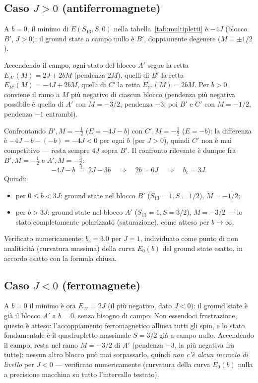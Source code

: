 \documentclass[11pt,a4paper]{article}
\begin{document}
\subsection{Caso $J>0$ (antiferromagnete)}

A $b=0$, il minimo di $E(S_{13},S,0)$ nella tabella~\ref{tab:multipletti} è
$-4J$ (blocco $B'$, $J>0$): il ground state a campo nullo è $B'$, doppiamente
degenere ($M=\pm1/2$).

Accendendo il campo, ogni stato del blocco $A'$ segue la retta
$E_{A'}(M)=2J+2bM$ (pendenza $2M$), quelli di $B'$ la retta
$E_{B'}(M)=-4J+2bM$, quelli di $C'$ la retta $E_{C'}(M)=2bM$. Per $b>0$
conviene il ramo a $M$ più negativo di ciascun blocco (pendenza più negativa
possibile è quella di $A'$ con $M=-3/2$, pendenza $-3$; poi $B'$ e $C'$ con
$M=-1/2$, pendenza $-1$ entrambi).

Confrontando $B',M=-\tfrac12$ ($E=-4J-b$) con $C',M=-\tfrac12$ ($E=-b$): la
differenza è $-4J-b-(-b)=-4J<0$ per ogni $b$ (per $J>0$), quindi $C'$ non è
mai competitivo — resta sempre $4J$ sopra $B'$. Il confronto rilevante è
dunque fra $B',M=-\tfrac12$ e $A',M=-\tfrac32$:
\begin{equation}
-4J-b \;\overset{!}{=}\; 2J-3b \quad\Longrightarrow\quad 2b=6J \quad\Longrightarrow\quad b_c = 3J .
\label{eq:bc}
\end{equation}
Quindi:
\begin{itemize}
\item per $0\le b<3J$: ground state nel blocco $B'$ ($S_{13}=1,S=1/2$), $M=-1/2$;
\item per $b>3J$: ground state nel blocco $A'$ ($S_{13}=1,S=3/2$), $M=-3/2$ — lo stato completamente polarizzato (saturazione), come atteso per $b\to\infty$.
\end{itemize}
Verificato numericamente: $b_c=3.0$ per $J=1$, individuato come punto di
non analiticità (curvatura massima) della curva $E_0(b)$ del ground state
esatto, in accordo esatto con la formula chiusa.

\subsection{Caso $J<0$ (ferromagnete)}

A $b=0$ il minimo è ora $E_{A'}=2J$ (il più negativo, dato $J<0$): il
ground state è già il blocco $A'$ a $b=0$, senza bisogno di campo. Non
essendoci frustrazione, questo è atteso: l'accoppiamento ferromagnetico
allinea tutti gli spin, e lo stato fondamentale è il quadrupletto massimale
$S=3/2$ già a campo nullo. Accendendo il campo, resta nel ramo $M=-3/2$ di
$A'$ (pendenza $-3$, la più negativa fra tutte): nessun altro blocco può mai
sorpassarlo, quindi \emph{non c'è alcun incrocio di livello} per $J<0$ —
verificato numericamente (curvatura della curva $E_0(b)$ nulla a precisione
macchina su tutto l'intervallo testato).
\end{document}
